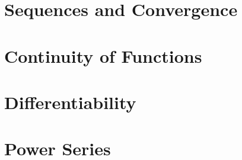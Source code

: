 \documentclass[british,11pt,a4paper]{report}
\begin{document}
\maketitle
\tableofcontents
\chapter{Sequences and Convergence}

\chapter{Continuity of Functions}

\chapter{Differentiability}

\chapter{Power Series}

\end{document}
